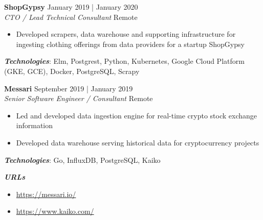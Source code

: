 \documentclass[a4paper]{article}
\newenvironment{jobdetails}%
    {\list{}{\leftmargin=4mm}\item[]}%
    {\endlist}
\begin{document}
\pagebreak




\textbf{ShopGypsy} \hfill January 2019 | January 2020 \\
\textit{CTO / Lead Technical Consultant} \hfill Remote \\
\vspace{2mm}

\begin{jobdetails}
\begin{itemize}
    \item Developed scrapers, data warehouse and supporting infrastructure for ingesting clothing offerings from data providers for a startup ShopGypsy
\end{itemize}
\vspace{2mm}

\textbf{\textit{Technologies}}: Elm, Postgrest, Python, Kubernetes, Google Cloud Platform (GKE, GCE), Docker, PostgreSQL, Scrapy

\end{jobdetails}
\vspace{1mm}


\textbf{Messari} \hfill September 2019 | January 2019 \\
\textit{Senior Software Engineer / Consultant } \hfill Remote \\
\vspace{2mm}

\begin{jobdetails}
\begin{itemize}
    \item Led and developed data ingestion engine for real-time crypto stock exchange information
    \item Developed data warehouse serving historical data for cryptocurrency projects
\end{itemize}
\vspace{2mm}

\textbf{\textit{Technologies}}: Go, InfluxDB, PostgreSQL, Kaiko

\textbf{\textit{URLs}}
\begin{itemize} \itemsep 1pt
	\item \url{https://messari.io/}
    \item \url{https://www.kaiko.com/}
\end{itemize}

\end{jobdetails}
\vspace{1mm}
\end{document}
